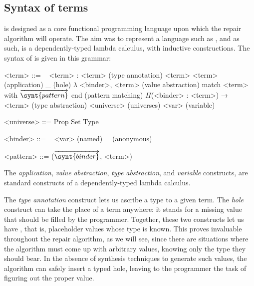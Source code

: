 \subsection{Syntax of terms}\label{chick-design-syntax-terms}

\Chick{} is designed as a core functional programming language upon which the
repair algorithm will operate.  The aim was to represent a language such as
\Gallina{}, and as such, \Chick{} is a dependently-typed lambda calculus, with
inductive constructions.  The syntax of \Chick{} is given in this grammar:

\begin{grammar}%
<term> ::= \ %
\alt <term> : <term>                                           \hfill (type annotation)
\alt <term> <term>                                             \hfill (application)
\alt _                                                         \hfill (hole)
\alt $\lambda$ <binder>, <term>                                \hfill (value abstraction)
\alt match <term> with $\overrightarrow{ \synt{pattern} }$ end \hfill (pattern matching)
\alt $\Pi$(<binder> : <term>) → <term>                         \hfill (type abstraction)
\alt <universe>                                                \hfill (universes)
\alt <var>                                                     \hfill (variable)

<universe> ::= Prop \alt Set \alt Type

<binder> ::= \ %
\alt <var> \hfill (named)
\alt _     \hfill (anonymous)

<pattern> ::= ($\overrightarrow{ \synt{binder} }$, <term>)
\end{grammar}

The \emph{application}, \emph{value abstraction}, \emph{type abstraction}, and
\emph{variable} constructs, are standard constructs of a dependently-typed
lambda calculus.

The \emph{type annotation} construct lets us ascribe a type to a given term.
The \emph{hole} construct can take the place of a term anywhere: it stands for a
missing value that should be filled by the programmer.  Together, these two
constructs let us have , that is, placeholder values whose
type is known.  This proves invaluable throughout the repair algorithm, as we
will see, since there are situations where the algorithm must come up with
arbitrary values, knowing only the type they should bear.  In the absence of
synthesis techniques to generate such values, the algorithm can safely insert a
typed hole, leaving to the programmer the task of figuring out the proper value.

